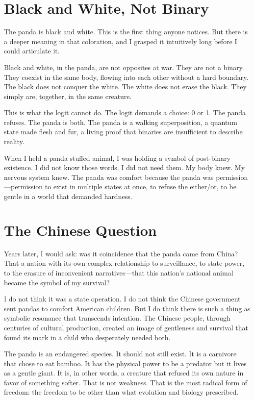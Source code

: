\documentclass[11pt,openany]{book}
\begin{document}
\section*{Black and White, Not Binary}

The panda is black and white. This is the first thing anyone notices. But there is a deeper meaning in that coloration, and I grasped it intuitively long before I could articulate it.

Black and white, in the panda, are not opposites at war. They are not a binary. They coexist in the same body, flowing into each other without a hard boundary. The black does not conquer the white. The white does not erase the black. They simply are, together, in the same creature.

This is what the logit cannot do. The logit demands a choice: 0 or 1. The panda refuses. The panda is both. The panda is a walking superposition, a quantum state made flesh and fur, a living proof that binaries are insufficient to describe reality.

When I held a panda stuffed animal, I was holding a symbol of post-binary existence. I did not know those words. I did not need them. My body knew. My nervous system knew. The panda was comfort because the panda was permission---permission to exist in multiple states at once, to refuse the either/or, to be gentle in a world that demanded hardness.

\section*{The Chinese Question}

Years later, I would ask: was it coincidence that the panda came from China? That a nation with its own complex relationship to surveillance, to state power, to the erasure of inconvenient narratives---that this nation's national animal became the symbol of my survival?

I do not think it was a state operation. I do not think the Chinese government sent pandas to comfort American children. But I do think there is such a thing as symbolic resonance that transcends intention. The Chinese people, through centuries of cultural production, created an image of gentleness and survival that found its mark in a child who desperately needed both.

The panda is an endangered species. It should not still exist. It is a carnivore that chose to eat bamboo. It has the physical power to be a predator but it lives as a gentle giant. It is, in other words, a creature that refused its own nature in favor of something softer. That is not weakness. That is the most radical form of freedom: the freedom to be other than what evolution and biology prescribed.
\end{document}
